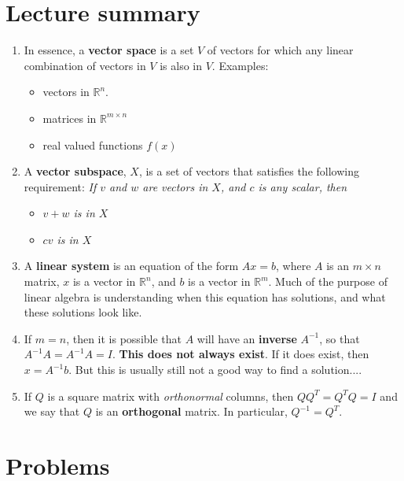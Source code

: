 \documentclass[11pt]{article}
\begin{document}
\section{Lecture summary}
\begin{enumerate}
\item In essence, a \textbf{vector space} is a set $V$ of vectors for which any linear combination of vectors in $V$ is also in $V$. Examples:
\begin{itemize}
\item vectors in $\mathbb{R}^n$.
\item matrices in $\mathbb{R}^{m\times n}$
\item real valued functions $f(x)$
\end{itemize}
\item A \textbf{vector subspace}, $X$, is a set of vectors that satisfies the following requirement: \emph{If $v$ and $w$ are vectors in $X$, and $c$ is any scalar, then}
\begin{itemize}
\item \emph{$v+w$ is in $X$}
\item \emph{$cv$ is in $X$}
\end{itemize}
\item A \textbf{linear system} is an equation of the form $Ax=b$, where $A$ is an $m\times n$ matrix, $x$ is a vector in $\mathbb{R}^n$, and $b$ is a vector in $\mathbb{R}^m$. Much of the purpose of linear algebra is understanding when this equation has solutions, and what these solutions look like. 
\item If $m=n$, then it is possible that $A$ will have an \textbf{inverse} $A^{-1}$, so that $A^{-1}A=A^{-1}A = I$. \textbf{This does not always exist}. If it does exist, then $x=A^{-1}b$. But this is usually still not a good way to find a solution.... 
\item If $Q$ is a square matrix with \emph{orthonormal} columns, then $QQ^T=Q^TQ = I$ and we say that $Q$ is an \textbf{orthogonal} matrix. In particular, $Q^{-1}=Q^T$. 
\end{enumerate}

\newpage

\section{Problems}
\end{document}
